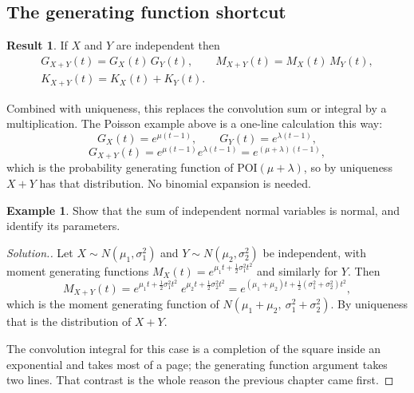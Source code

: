 \documentclass[11pt,a4paper]{article}
\theoremstyle{definition}
\newtheorem{exa}[thm]{Example}
\newtheorem{result}[thm]{Result}
\newenvironment{solution}
  {\renewcommand{\qedsymbol}{}\begin{proof}[\textit{Solution}.]}
  {\end{proof}}
\begin{document}
\subsection{The generating function shortcut}

\begin{result}
If $X$ and $Y$ are independent then
\begin{gather*}
G_{X+Y}(t) = G_X(t)\,G_Y(t),\qquad M_{X+Y}(t) = M_X(t)\,M_Y(t), \\
K_{X+Y}(t) = K_X(t) + K_Y(t).
\end{gather*}
\end{result}

Combined with uniqueness, this replaces the convolution sum or integral by a
multiplication. The Poisson example above is a one-line calculation this way:
$$G_X(t) = e^{\mu(t-1)},\qquad G_Y(t) = e^{\lambda(t-1)},$$
$$G_{X+Y}(t) = e^{\mu(t-1)}e^{\lambda(t-1)} = e^{(\mu+\lambda)(t-1)},$$
which is the probability generating function of POI$(\mu+\lambda)$, so by
uniqueness $X+Y$ has that distribution. No binomial expansion is needed.

\begin{exa}
Show that the sum of independent normal variables is normal, and identify its
parameters.
\end{exa}

\begin{solution}
Let $X\sim N\left(\mu_1,\sigma_1^{2}\right)$ and
$Y\sim N\left(\mu_2,\sigma_2^{2}\right)$ be independent, with moment generating
functions $M_X(t)=e^{\mu_1 t + \frac12\sigma_1^{2}t^{2}}$ and similarly for $Y$.
Then
$$M_{X+Y}(t) = e^{\mu_1 t + \frac12\sigma_1^{2}t^{2}}\;
e^{\mu_2 t + \frac12\sigma_2^{2}t^{2}}
= e^{(\mu_1+\mu_2)t + \frac12\left(\sigma_1^{2}+\sigma_2^{2}\right)t^{2}},$$
which is the moment generating function of
$N\left(\mu_1+\mu_2,\ \sigma_1^{2}+\sigma_2^{2}\right)$. By uniqueness that is
the distribution of $X+Y$.

The convolution integral for this case is a completion of the square inside an
exponential and takes most of a page; the generating function argument takes two
lines. That contrast is the whole reason the previous chapter came first.
\end{solution}
\end{document}
